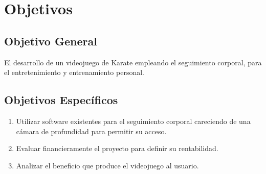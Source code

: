 \chapter{Objetivos}


\section{Objetivo General}

El desarrollo de un videojuego de Karate empleando el seguimiento corporal, para el entretenimiento y entrenamiento personal.

\section{Objetivos Específicos}

\begin{enumerate}
	\item Utilizar software existentes para el seguimiento corporal careciendo de una cámara de profundidad para permitir su acceso.
	\item Evaluar financieramente el proyecto para definir su rentabilidad.
	\item Analizar el beneficio que produce el videojuego al usuario.
\end{enumerate}

